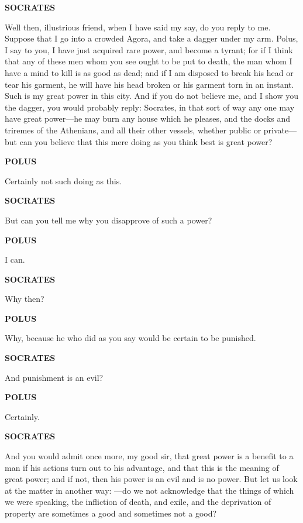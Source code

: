 \documentclass[11pt,letter]{article}
\begin{document}
\par \textbf{SOCRATES}
\par   Well then, illustrious friend, when I have said my say, do you reply to me. Suppose that I go into a crowded Agora, and take a dagger under my arm. Polus, I say to you, I have just acquired rare power, and become a tyrant; for if I think that any of these men whom you see ought to be put to death, the man whom I have a mind to kill is as good as dead; and if I am disposed to break his head or tear his garment, he will have his head broken or his garment torn in an instant. Such is my great power in this city. And if you do not believe me, and I show you the dagger, you would probably reply:  Socrates, in that sort of way any one may have great power—he may burn any house which he pleases, and the docks and triremes of the Athenians, and all their other vessels, whether public or private—but can you believe that this mere doing as you think best is great power?

\par \textbf{POLUS}
\par   Certainly not such doing as this.

\par \textbf{SOCRATES}
\par   But can you tell me why you disapprove of such a power?

\par \textbf{POLUS}
\par   I can.

\par \textbf{SOCRATES}
\par   Why then?

\par \textbf{POLUS}
\par   Why, because he who did as you say would be certain to be punished.

\par \textbf{SOCRATES}
\par   And punishment is an evil?

\par \textbf{POLUS}
\par   Certainly.

\par \textbf{SOCRATES}
\par   And you would admit once more, my good sir, that great power is a benefit to a man if his actions turn out to his advantage, and that this is the meaning of great power; and if not, then his power is an evil and is no power. But let us look at the matter in another way: —do we not acknowledge that the things of which we were speaking, the infliction of death, and exile, and the deprivation of property are sometimes a good and sometimes not a good?
\end{document}
